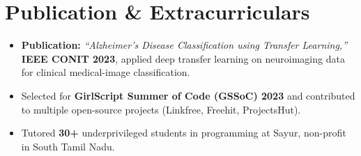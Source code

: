 \documentclass[letterpaper,10pt]{article}
\begin{document}
\section{Publication \& Extracurriculars}
\begin{itemize}[leftmargin=0.18in, itemsep=0pt, topsep=1pt]
  \item\small \textbf{Publication:} \textit{``Alzheimer's Disease Classification using Transfer Learning,''} \textbf{IEEE CONIT 2023}, applied deep transfer learning on neuroimaging data for clinical medical-image classification.
  \item\small Selected for \textbf{GirlScript Summer of Code (GSSoC) 2023} and contributed to multiple open-source projects (Linkfree, Freehit, ProjectsHut).
  \item\small Tutored \textbf{30+} underprivileged students in programming at Sayur, non-profit in South Tamil Nadu.
\end{itemize}
\vspace{-6pt}
\end{document}

